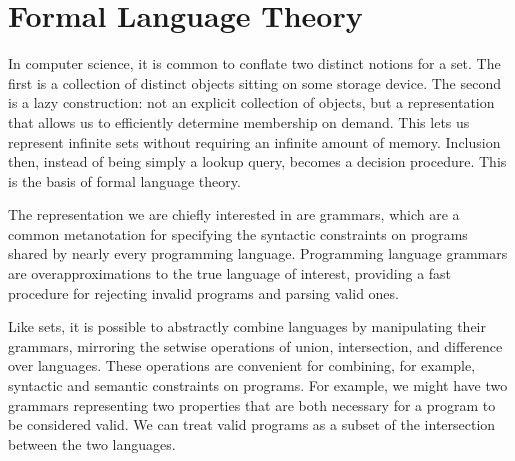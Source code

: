 \chapter{\rm\bfseries Formal Language Theory}
\label{ch:chapter01}

In computer science, it is common to conflate two distinct notions for a set. The first is a collection of distinct objects sitting on some storage device. The second is a lazy construction: not an explicit collection of objects, but a representation that allows us to efficiently determine membership on demand. This lets us represent infinite sets without requiring an infinite amount of memory. Inclusion then, instead of being simply a lookup query, becomes a decision procedure. This is the basis of formal language theory.

The representation we are chiefly interested in are grammars, which are a common metanotation for specifying the syntactic constraints on programs shared by nearly every programming language. Programming language grammars are overapproximations to the true language of interest, providing a fast procedure for rejecting invalid programs and parsing valid ones.

Like sets, it is possible to abstractly combine languages by manipulating their grammars, mirroring the setwise operations of union, intersection, and difference over languages. These operations are convenient for combining, for example, syntactic and semantic constraints on programs. For example, we might have two grammars representing two properties that are both necessary for a program to be considered valid. We can treat valid programs as a subset of the intersection between the two languages.